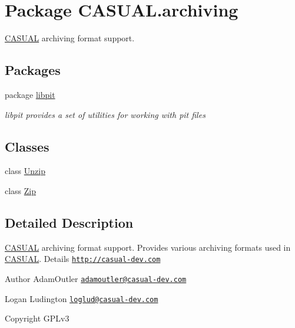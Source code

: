 \hypertarget{namespace_c_a_s_u_a_l_1_1archiving}{\section{Package C\-A\-S\-U\-A\-L.\-archiving}
\label{namespace_c_a_s_u_a_l_1_1archiving}
}


\hyperlink{namespace_c_a_s_u_a_l}{C\-A\-S\-U\-A\-L} archiving format support.  


\subsection*{Packages}
\begin{DoxyCompactItemize}
\item 
package \hyperlink{namespace_c_a_s_u_a_l_1_1archiving_1_1libpit}{libpit}
\begin{DoxyCompactList}\small\item\em libpit provides a set of utilities for working with pit files \end{DoxyCompactList}\end{DoxyCompactItemize}
\subsection*{Classes}
\begin{DoxyCompactItemize}
\item 
class \hyperlink{class_c_a_s_u_a_l_1_1archiving_1_1_unzip}{Unzip}
\item 
class \hyperlink{class_c_a_s_u_a_l_1_1archiving_1_1_zip}{Zip}
\end{DoxyCompactItemize}


\subsection{Detailed Description}
\hyperlink{namespace_c_a_s_u_a_l}{C\-A\-S\-U\-A\-L} archiving format support. Provides various archiving formats used in \hyperlink{namespace_c_a_s_u_a_l}{C\-A\-S\-U\-A\-L}. Details \href{http://casual-dev.com}{\tt http\-://casual-\/dev.\-com} \begin{DoxyAuthor}{Author}
Adam\-Outler \href{mailto:adamoutler@casual-dev.com}{\tt adamoutler@casual-\/dev.\-com} 

Logan Ludington \href{mailto:loglud@casual-dev.com}{\tt loglud@casual-\/dev.\-com} 
\end{DoxyAuthor}
\begin{DoxyCopyright}{Copyright}
G\-P\-Lv3 
\end{DoxyCopyright}
